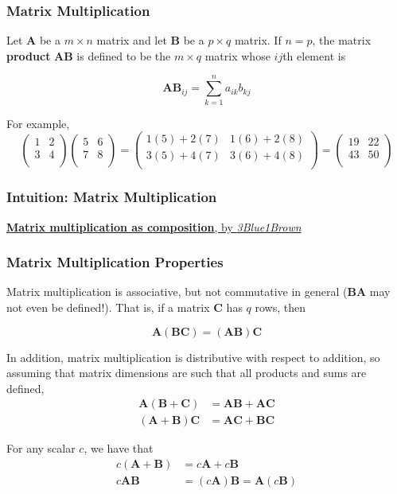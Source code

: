 \documentclass{beamer}
\begin{document}
\begin{frame}
\frametitle{Matrix Multiplication}
Let $\mathbf{A}$ be a $m \times n$ matrix and let $\mathbf{B}$ be a $p \times q$ matrix.  If $n = p$, the matrix \textbf{product} $\mathbf{AB}$ is defined to be the $m \times q$ matrix whose $ij$th element is

\[\mathbf{AB}_{ij} = \sum_{k=1}^n a_{ik}b_{kj}\]

For example, 
\[
\begin{pmatrix}
    1 & 2\\
    3 & 4 \\
\end{pmatrix}
\begin{pmatrix}
    5 & 6\\
    7 & 8 \\
\end{pmatrix}
= 
\begin{pmatrix}
    1(5) + 2(7) & 1(6) + 2(8)\\
    3(5) + 4(7) & 3(6) + 4(8) \\
\end{pmatrix}
=
\begin{pmatrix}
    19 & 22\\
    43 & 50 \\
\end{pmatrix}
\]
\end{frame}

 \begin{frame}
\frametitle{Intuition: Matrix Multiplication}

\href{https://www.youtube.com/watch?v=XkY2DOUCWMU&index=4&list=PLZHQObOWTQDPD3MizzM2xVFitgF8hE_ab}{\textbf{Matrix multiplication as composition}, by \textit{3Blue1Brown}}
\end{frame}

\begin{frame}
\frametitle{Matrix Multiplication Properties}
Matrix multiplication is associative, but not commutative in general ($\mathbf{BA}$ may not even be defined!).  That is, if a matrix $\mathbf{C}$ has $q$ rows, then

\[\mathbf{A}(\mathbf{BC}) = (\mathbf{AB})\mathbf{C}\]

In addition, matrix multiplication is distributive with respect to addition, so assuming that matrix dimensions are such that all products and sums are defined,
\begin{align*}
\mathbf{A} (\mathbf{B} + \mathbf{C}) &= \mathbf{AB} + \mathbf{AC}\\
(\mathbf{A} + \mathbf{B}) \mathbf{C}  &= \mathbf{AC} + \mathbf{BC}
\end{align*}

For any scalar $c$, we have that
\begin{align*}
c(\mathbf{A} + \mathbf{B}) &= c\mathbf{A} + c\mathbf{B}\\
c\mathbf{AB} &= (c\mathbf{A})\mathbf{B} = \mathbf{A}(c\mathbf{B})
\end{align*}
\end{frame}
\end{document}
